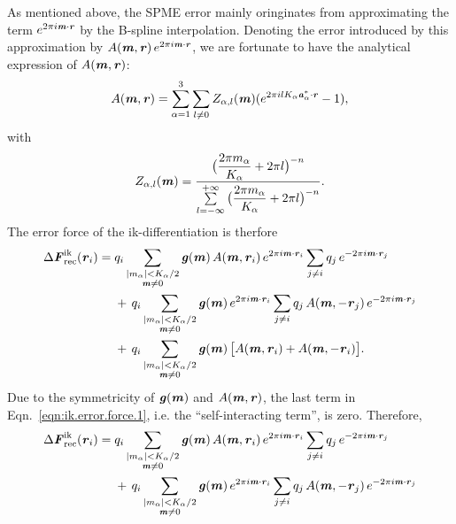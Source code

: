 \documentclass[aps,pre,preprint]{revtex4}
\renewcommand{\v}[1]{\textbf{\textit{#1}}}
\begin{document}
As mentioned above, the SPME error mainly oringinates from approximating
the term $e^{2\pi i\v m\cdot\v r}$ by the B-spline
interpolation. Denoting the error introduced by this approximation by
$A(\v m, \v r)\,e^{2\pi i\v m\cdot \v r}$, we are fortunate to have
the analytical expression of $A(\v m, \v r)$:
\begin{align}\label{eqn:error-A}
  A(\v m, \v r)
  =
  \sum_{\alpha=1}^3\sum_{l\neq 0}
  Z_{\alpha,l}(\v m)
  (
  e^{2\pi i l K_\alpha\v a^\ast_\alpha\cdot \v r} - 1
  ),
\end{align}
with
\begin{align}
  Z_{\alpha,l}(\v m) = \frac
  {\big(\dfrac{2\pi m_\alpha}{K_\alpha} + 2\pi l\big)^{-n}}
  {\sum\limits_{l=-\infty}^{+\infty}
    \big(\dfrac{2\pi m_\alpha}{K_\alpha} + 2\pi l\big)^{-n}}.
\end{align}
The error force of the ik-differentiation is therfore
\begin{align}\nonumber
  \Delta\v F_{\textrm{rec}}^{\textrm{ik}}(\v r_i)
  =\;&
  q_i
  \sum_{
    \begin{subarray}{c}
      \vert m_{\alpha}\vert < K_\alpha/2\\
      \v m\neq 0
    \end{subarray}}
  \v g(\v m)\,
  A(\v m, \v r_i)\,
  e^{2\pi i\v m\cdot \v r_i}
  \sum_{j\neq i}q_j\,e^{-2\pi i\v m\cdot\v r_j} \\\nonumber
  & +\,
  q_i
  \sum_{
    \begin{subarray}{c}
      \vert m_{\alpha}\vert < K_\alpha/2\\
      \v m\neq 0
    \end{subarray}}
  \v g(\v m)\,
  e^{2\pi i\v m\cdot \v r_i}
  \sum_{j\neq i}q_j\,A(\v m, -\v r_j)\,e^{-2\pi i\v m\cdot\v r_j}\\\label{eqn:ik.error.force.1}
  & +\,
  q_i
  \sum_{
    \begin{subarray}{c}
      \vert m_{\alpha}\vert < K_\alpha/2\\
      \v m\neq 0
    \end{subarray}}
  \v g(\v m)\,
  \big[
  A(\v m, \v r_i) +
  A(\v m, -\v r_i)
  \big].
\end{align}
Due to the symmetricity of $\v g(\v m)$ and $A(\v m, \v r)$,
the last term in Eqn.~\eqref{eqn:ik.error.force.1},
i.e. the ``self-interacting term'', is zero.
Therefore,
\begin{align}\nonumber
  \Delta\v F_{\textrm{rec}}^{\textrm{ik}}(\v r_i)
  =\;&
  q_i
  \sum_{
    \begin{subarray}{c}
      \vert m_{\alpha}\vert < K_\alpha/2\\
      \v m\neq 0
    \end{subarray}}
  \v g(\v m)\,
  A(\v m, \v r_i)\,
  e^{2\pi i\v m\cdot \v r_i}
  \sum_{j\neq i}q_j\,e^{-2\pi i\v m\cdot\v r_j} \\\label{eqn:ik.error.force}
  & +\,
  q_i
  \sum_{
    \begin{subarray}{c}
      \vert m_{\alpha}\vert < K_\alpha/2\\
      \v m\neq 0
    \end{subarray}}
  \v g(\v m)\,
  e^{2\pi i\v m\cdot \v r_i}
  \sum_{j\neq i}q_j\,A(\v m, -\v r_j)\,e^{-2\pi i\v m\cdot\v r_j}
\end{align}
\end{document}
